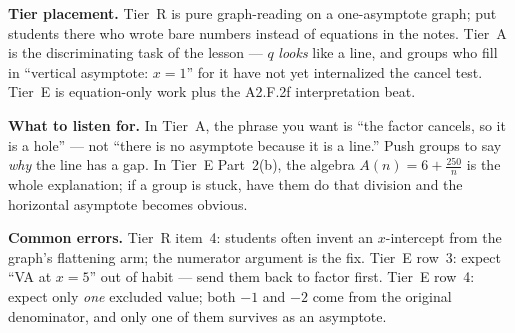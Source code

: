 \documentclass[10pt]{article}
\begin{document}
\begin{teachernote}
\textbf{Tier placement.} Tier~R is pure graph-reading on a one-asymptote graph; put students there
who wrote bare numbers instead of equations in the notes. Tier~A is the discriminating task of the
lesson --- $q$ \emph{looks} like a line, and groups who fill in ``vertical asymptote: $x=1$'' for it
have not yet internalized the cancel test. Tier~E is equation-only work plus the A2.F.2f
interpretation beat.

\textbf{What to listen for.} In Tier~A, the phrase you want is ``the factor cancels, so it is a hole''
--- not ``there is no asymptote because it is a line.'' Push groups to say \emph{why} the line has a
gap. In Tier~E Part~2(b), the algebra $A(n)=6+\frac{250}{n}$ is the whole explanation; if a group is
stuck, have them do that division and the horizontal asymptote becomes obvious.

\textbf{Common errors.} Tier~R item~4: students often invent an $x$-intercept from the graph's
flattening arm; the numerator argument is the fix. Tier~E row~3: expect ``VA at $x=5$'' out of habit
--- send them back to factor first. Tier~E row~4: expect only \emph{one} excluded value; both $-1$ and
$-2$ come from the original denominator, and only one of them survives as an asymptote.
\end{teachernote}
\end{document}
